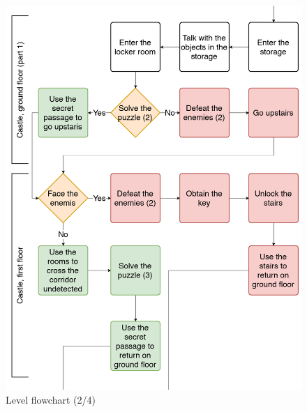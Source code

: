 \begin{figure}[H]
  \centering
  \includegraphics[width=15cm]{Images/Diagrams/dynamia_2}
  \caption{Level flowchart (2/4)}
\end{figure}

